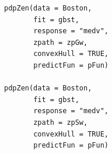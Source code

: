 \begin{verbatim}
pdpZen(data = Boston,
       fit = gbst,
       response = "medv",
       zpath = zpGw,
       convexHull = TRUE,
       predictFun = pFun) 

pdpZen(data = Boston,
       fit = gbst,
       response = "medv",
       zpath = zpSw,
       convexHull = TRUE,
       predictFun = pFun)
\end{verbatim}

\begin{figure}

{\centering {}

}
\end{figure}
